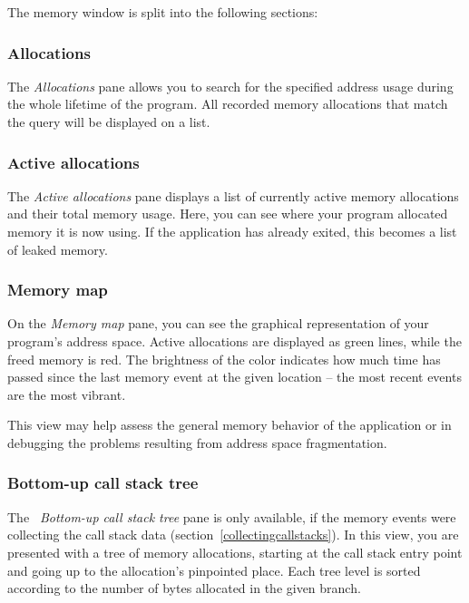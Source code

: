 \documentclass[hidelinks,titlepage,a4paper,twoside]{article}
\begin{document}
The memory window is split into the following sections:

\subsubsection{Allocations}

The \emph{\faAt{} Allocations} pane allows you to search for the specified address usage during the whole lifetime of the program. All recorded memory allocations that match the query will be displayed on a list.

\subsubsection{Active allocations}

The \emph{\faHeartbeat{} Active allocations} pane displays a list of currently active memory allocations and their total memory usage. Here, you can see where your program allocated memory it is now using. If the application has already exited, this becomes a list of leaked memory.

\subsubsection{Memory map}

On the \emph{\faMap{} Memory map} pane, you can see the graphical representation of your program's address space. Active allocations are displayed as green lines, while the freed memory is red. The brightness of the color indicates how much time has passed since the last memory event at the given location -- the most recent events are the most vibrant.

This view may help assess the general memory behavior of the application or in debugging the problems resulting from address space fragmentation.

\subsubsection{Bottom-up call stack tree}
\label{callstacktree}

The \emph{\faTree{}~Bottom-up call stack tree} pane is only available, if the memory events were collecting the call stack data (section~\ref{collectingcallstacks}). In this view, you are presented with a tree of memory allocations, starting at the call stack entry point and going up to the allocation's pinpointed place. Each tree level is sorted according to the number of bytes allocated in the given branch.
\end{document}
